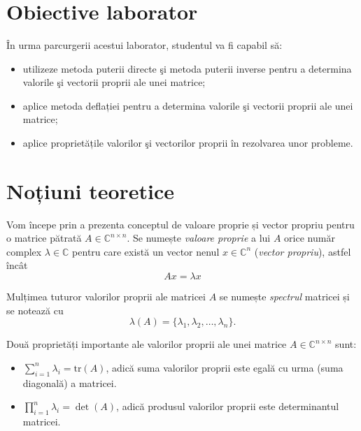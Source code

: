 \documentclass{exam}
\title{
\textmd{\textbf{\MNLabTitle}}
\author{}
\date{}
}
\begin{document}
\begin{coverpages}
	\maketitle
	\thispagestyle{empty}
	\tableofcontents
\end{coverpages}

\section{Obiective laborator}

În urma parcurgerii acestui laborator, studentul va fi capabil să:

\begin{itemize}
	\item utilizeze metoda puterii directe şi metoda puterii inverse pentru a
	      determina valorile şi vectorii proprii ale unei matrice;
	\item aplice metoda deflației pentru a determina valorile şi vectorii
	      proprii ale unei matrice;
	\item aplice proprietățile valorilor şi vectorilor proprii în rezolvarea
	      unor probleme.
\end{itemize}

\section{Noțiuni teoretice}

Vom începe prin a prezenta conceptul de valoare proprie și vector propriu pentru
o matrice pătrată
$A \in \mathbb{C}^{n\times n}$. Se numește \emph{valoare proprie} a lui $A$
orice număr complex
$\lambda \in \mathbb{C}$ pentru care există un vector nenul
$x \in \mathbb{C}^{n}$ (\emph{vector propriu}), astfel încât
\begin{equation*}
	A x = \lambda x
\end{equation*}

Mulțimea tuturor valorilor proprii ale matricei $A$ se numește \textit{spectrul}
matricei și se notează cu
\begin{equation*}
	\lambda(A) = \{ \lambda_1, \lambda_2, \ldots, \lambda_n\}.
\end{equation*}

Două proprietăți importante ale valorilor proprii ale unei matrice $A\in\mathbb{C}^{n\times n}$ sunt:
\begin{itemize}
	\item $\sum_{i=1}^n \lambda_{i} = \mathrm{tr}(A)$, adică suma
	      valorilor proprii este egală cu urma (suma diagonală) a matricei.
	\item $\prod_{i=1}^n \lambda_{i} = \det(A)$, adică produsul valorilor
	      proprii este determinantul matricei.
\end{itemize}
\end{document}
